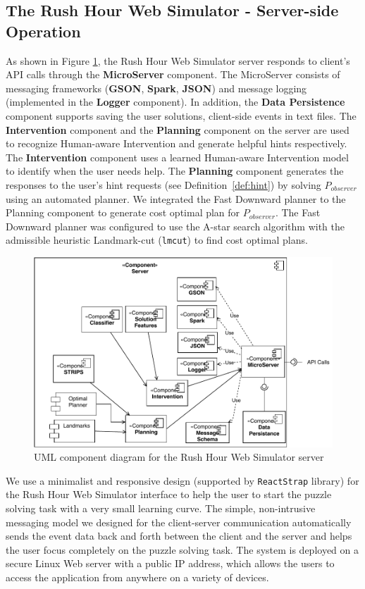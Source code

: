 \subsection{The Rush Hour Web Simulator - Server-side Operation}
As shown in Figure \ref{fig:compserver}, the Rush Hour Web Simulator server responds to client's API calls through the \textbf{MicroServer} component.
The MicroServer consists of messaging frameworks (\textbf{GSON}, \textbf{Spark}, \textbf{JSON}) and message logging (implemented in the \textbf{Logger} component).
In addition, the \textbf{Data Persistence} component supports saving the user solutions, client-side events in text files.
The \textbf{Intervention} component and the \textbf{Planning} component on the server are used to recognize Human-aware Intervention and generate helpful hints respectively. The \textbf{Intervention} component uses a learned Human-aware Intervention model to identify when the user needs help. 
The \textbf{Planning} component generates the responses to the user's hint requests (see Definition~\ref{def:hint}) by solving $P_{observer}$ using an automated planner.
We integrated the Fast Downward planner \cite{helmert2006} to the Planning component to generate cost optimal plan for $P_{observer}$. 
The Fast Downward planner was configured to use the A-star search algorithm with the admissible heuristic Landmark-cut (\texttt{lmcut}) \cite{helmert2009} to find cost optimal plans.
\begin{figure}[tpb]
  \centering
\includegraphics[width=\columnwidth]{img/componentserver.pdf}
  \caption{UML component diagram for the Rush Hour Web Simulator server}
  \label{fig:compserver}
\end{figure}

We use a minimalist and responsive design (supported by \texttt{ReactStrap} library) for the Rush Hour Web Simulator interface to help the user to start the puzzle solving task with a very small learning curve. 
The simple, non-intrusive messaging model we designed for the client-server communication automatically sends the event data back and forth between the client and the server and helps the user focus completely on the puzzle solving task.
The system is deployed on a secure Linux Web server with a public IP address, which allows the users to access the application from anywhere on a variety of devices. 



